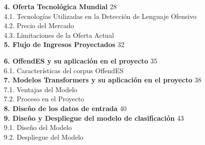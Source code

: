 \noindent \textbf{4. Oferta Tecnológica Mundial} \hfill 28\\
\hspace*{1cm}4.1. Tecnologías Utilizadas en la Detección de Lenguaje Ofensivo \\
\hspace*{1cm}4.2. Precio del Mercado \\
\hspace*{1cm}4.3. Limitaciones de la Oferta Actual \\[0.3cm]

\noindent \textbf{5. Flujo de Ingresos Proyectados} \hfill 32




\vspace{0.8cm}

\noindent \textbf{6. OffendES y su aplicación en el proyecto} \hfill 35\\
\hspace*{1cm}6.1. Características del corpus OffendES \\[0.3cm]

\noindent \textbf{7. Modelos Transformers y su aplicación en el proyecto} \hfill 38\\
\hspace*{1cm}7.1. Ventajas del Modelo \\
\hspace*{1cm}7.2. Proceso en el Proyecto \\[0.3cm]

\noindent \textbf{8. Diseño de los datos de entrada} \hfill 40\\[0.3cm]

\noindent \textbf{9. Diseño y Despliegue del modelo de clasificación} \hfill 43\\
\hspace*{1cm}9.1. Diseño del Modelo \\
\hspace*{1cm}9.2. Despliegue del Modelo \\[0.3cm]

